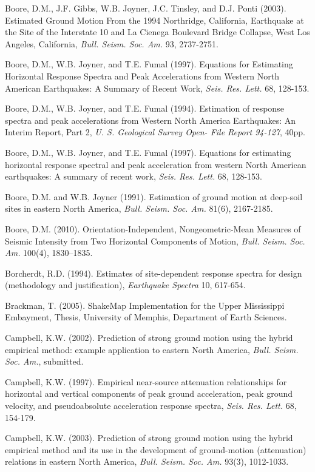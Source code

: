 \documentclass[letterpaper,10pt,english]{sphinxmanual}
\begin{document}
Boore, D.M., J.F. Gibbs, W.B. Joyner, J.C. Tinsley, and D.J. Ponti (2003). Estimated Ground Motion
From the 1994 Northridge, California, Earthquake at the Site of the Interstate 10 and La Cienega
Boulevard Bridge Collapse, West Los Angeles, California, \emph{Bull. Seism. Soc. Am.} 93, 2737-2751.

Boore, D.M., W.B. Joyner, and T.E. Fumal (1997). Equations for Estimating Horizontal Response Spectra
and Peak Accelerations from Western North American Earthquakes: A Summary of Recent Work,
\emph{Seis. Res. Lett.} 68, 128-153.

Boore, D.M., W.B. Joyner, and T.E. Fumal (1994). Estimation of response spectra and peak accelerations
from Western North America Earthquakes: An Interim Report, Part 2, \emph{U. S. Geological Survey Open-
File Report 94-127}, 40pp.

Boore, D.M., W.B. Joyner, and T.E. Fumal (1997). Equations for estimating horizontal response spectral
and peak acceleration from western North American earthquakes: A summary of recent work, \emph{Seis.
Res. Lett.} 68, 128-153.

Boore, D.M. and W.B. Joyner (1991). Estimation of ground motion at deep-soil sites in eastern North
America, \emph{Bull. Seism. Soc. Am.} 81(6), 2167-2185.

\label{references:boore2010}
Boore, D.M. (2010). Orientation-Independent, Nongeometric-Mean Measures of Seismic Intensity
from Two Horizontal Components of Motion, \emph{Bull. Seism. Soc. Am.} 100(4), 1830–1835.

\label{references:borcherdt1994}
Borcherdt, R.D. (1994). Estimates of site-dependent response spectra for design (methodology and
justification), \emph{Earthquake Spectra} 10, 617-654.

Brackman, T. (2005). ShakeMap Implementation for the Upper Mississippi Embayment, Thesis, University
of Memphis, Department of Earth Sciences.

Campbell, K.W. (2002). Prediction of strong ground motion using the hybrid empirical method: example
application to eastern North America, \emph{Bull. Seism. Soc. Am.}, submitted.

Campbell, K.W. (1997). Empirical near-source attenuation relationships for horizontal and vertical
components of peak ground acceleration, peak ground velocity, and pseudoabsolute acceleration
response spectra, \emph{Seis. Res. Lett.} 68, 154-179.

Campbell, K.W. (2003). Prediction of strong ground motion using the hybrid empirical method and its use
in the development of ground-motion (attenuation) relations in eastern North America, \emph{Bull. Seism. Soc.
Am.} 93(3), 1012-1033.
\end{document}
